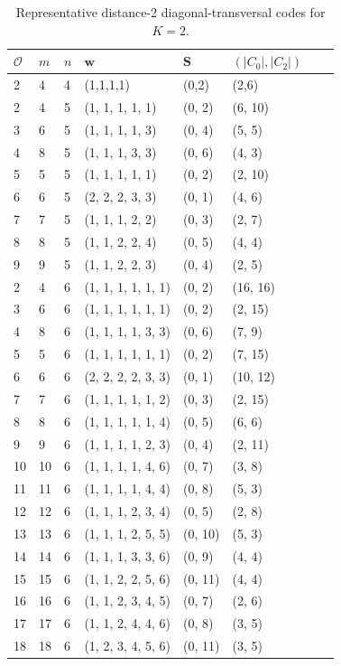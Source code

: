 \documentclass[11pt]{article}
\begin{document}
\begin{table}[t]
  \caption{Representative distance-2 diagonal-transversal codes for $K=2$.}
  \label{tab:K=2}
  \begin{tabular*}{\textwidth}{@{\extracolsep{\fill}}llllllll}
    \toprule
    $\mathcal{O}$ & $m$ & $n$ & $\mathbf w$
    & $\mathbf S$ & $(|C_0|,|C_2|)$ \\
    \midrule
    2 & 4 & 4 & (1,1,1,1) & (0,2) & (2,6) \\
    \midrule
    2   & 4   & 5 & (1, 1, 1, 1, 1)           & (0, 2) & (6, 10)  \\
    3   & 6   & 5 & (1, 1, 1, 1, 3)           & (0, 4) & (5, 5) \\
    4   & 8   & 5 & (1, 1, 1, 3, 3)           & (0, 6) & (4, 3) \\
    5   & 5   & 5 & (1, 1, 1, 1, 1)           & (0, 2) & (2, 10) \\
    6   & 6   & 5 & (2, 2, 2, 3, 3)           & (0, 1) & (4, 6) \\
    7   & 7   & 5 & (1, 1, 1, 2, 2)           & (0, 3) & (2, 7) \\
    8   & 8   & 5 & (1, 1, 2, 2, 4)           & (0, 5) & (4, 4) \\
    9   & 9   & 5 & (1, 1, 2, 2, 3)           & (0, 4) & (2, 5) \\
    \midrule
    2   & 4   & 6 & (1, 1, 1, 1, 1, 1)        & (0, 2) & (16, 16) \\
    3   & 6   & 6 & (1, 1, 1, 1, 1, 1)        & (0, 2) & (2, 15) \\
    4   & 8   & 6 & (1, 1, 1, 1, 3, 3)        & (0, 6) & (7, 9) \\
    5   & 5   & 6 & (1, 1, 1, 1, 1, 1)        & (0, 2) & (7, 15) \\
    6   & 6   & 6 & (2, 2, 2, 2, 3, 3)        & (0, 1) & (10, 12) \\
    7   & 7   & 6 & (1, 1, 1, 1, 1, 2)        & (0, 3) & (2, 15) \\
    8   & 8   & 6 & (1, 1, 1, 1, 1, 4)        & (0, 5) & (6, 6) \\
    9   & 9   & 6 & (1, 1, 1, 1, 2, 3)        & (0, 4) & (2, 11) \\
    10  & 10  & 6 & (1, 1, 1, 1, 4, 6)        & (0, 7) & (3, 8) \\
    11  & 11  & 6 & (1, 1, 1, 1, 4, 4)        & (0, 8) & (5, 3) \\
    12  & 12  & 6 & (1, 1, 1, 2, 3, 4)        & (0, 5) & (2, 8) \\
    13  & 13  & 6 & (1, 1, 1, 2, 5, 5)        & (0, 10) & (5, 3)\\
    14  & 14  & 6 & (1, 1, 1, 3, 3, 6)        & (0, 9)  & (4, 4)\\
    15  & 15  & 6 & (1, 1, 2, 2, 5, 6)        & (0, 11) & (4, 4)\\
    16  & 16  & 6 & (1, 1, 2, 3, 4, 5)        & (0, 7) & (2, 6) \\
    17  & 17  & 6 & (1, 1, 2, 4, 4, 6)        & (0, 8) & (3, 5)\\
    18  & 18  & 6 & (1, 2, 3, 4, 5, 6)        & (0, 11) & (3, 5)\\
    \bottomrule
  \end{tabular*}
\end{table}
\end{document}
